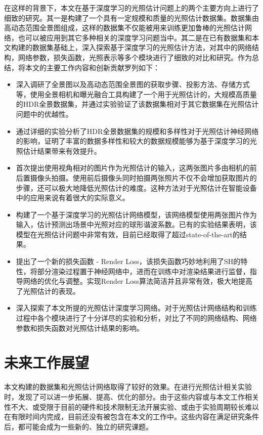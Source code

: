 在这样的背景下，本文在基于深度学习的光照估计问题上的两个主要方向上进行了细致的研究。其一是构建了一个具有一定规模和质量的光照估计数据集。数据集由高动态范围全景图组成，这样的数据集不仅能被用来训练更加鲁棒的光照估计网络，也可以被应用到其它多种相关的深度学习问题当中。其二是在已有数据集和本文构建的数据集基础上，深入探索基于深度学习的光照估计方法，对其中的网络结构，网络参数，损失函数，光照表示等多个模块进行了细致的对比和研究。作为总结，将本文的主要工作内容和创新贡献罗列如下：
\begin{itemize}
    \item 深入调研了全景图以及高动态范围全景图的获取步骤、投影方法、存储方式等，使用全景相机和曝光融合工具构建了一个用于光照估计的，大规模高质量的HDR全景数据集，并通过实验验证了该数据集相对于其它数据集在光照估计问题中的优越性。
    \item 通过详细的实验分析了HDR全景数据集的规模和多样性对于光照估计神经网络的影响，证明了丰富的数据多样性和较大的数据规模能够为基于深度学习的光照估计结果带来有效提升。
    \item 首次提出使用视角相对的图片作为光照估计的输入，这两张图片多由相机的前后置摄像头拍摄。使用前后摄像头同时拍摄两张照片不仅不会增加获取图片的步骤，还可以极大地降低光照估计的难度。这种方法对于光照估计在智能设备中的应用来说有着很大的实际意义。
    \item 构建了一个基于深度学习的光照估计网络模型，该网络模型使用两张图片作为输入，估计预测出场景中光照对应的球形谐波系数。已有的实验结果表明，该模型在光照估计问题中非常有效，目前已经取得了超过state-of-the-art的结果。
    \item 提出了一个新的损失函数 - Render Loss，该损失函数巧妙地利用了SH的特性，将部分渲染过程置于神经网络中，进而在训练中对渲染结果进行监督，指导网络的优化与调整。实现Render Loss算法简洁并且非常有效，极大地提高了光照估计的表现。
    \item 深入探索了本文所提的光照估计深度学习网络。对于光照估计网络结构和训练过程中各个模块进行了十分详尽的实验和分析，对比了不同的网络结构、网络参数和损失函数对光照估计结果的影响。
\end{itemize}

\section{未来工作展望}
本文构建的数据集和光照估计网络取得了较好的效果。在进行光照估计相关实验时，发现了可以进一步拓展、提高、优化的部分。由于这些内容或与本文工作相关性不大、或受限于目前的硬件和技术限制无法开展实验、或由于实验周期较长难以在有限时间内完成，目前还没有被包含在本文的工作中。这些内容在满足研究条件后，都可能会成为一些新的、独立的研究课题。

